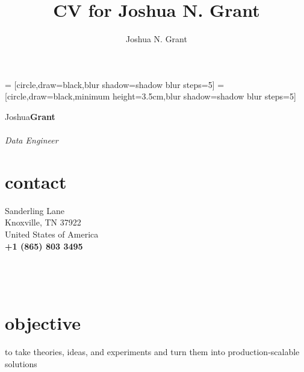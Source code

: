 \documentclass[10pt]{article}%
\author{Joshua N. Grant}
\title{CV for Joshua N. Grant}
\begin{document}
%
%
 = [circle,draw=black,blur shadow={shadow blur steps=5}]%
 = [circle,draw=black,minimum height=3.5cm,blur shadow={shadow blur steps=5}]%
\begin{minipage}[ht]{.25\linewidth}%
  \setlength{\headsep}{-10pt}
  \setlength{\voffset}{-0.75in}
   {\Large Joshua\huge\textbf{Grant}} \\ \\
   {\large \textit{Data Engineer}}
   \section*{\faUser{} contact}%
      Sanderling Lane \\
     Knoxville, TN 37922 \\
     United States of America  \\
     \textbf{+1 (865) 803 3495} \faMobile \\
     \href{mailto:jngrant@live.com}{\color{linkcolor}{jngrant@live.com \faEnvelope}} \\
     \href{http://notjustadatum.blogspot.com}{\color{linkcolor}{notjustadatum.blogspot.com \faBold}} \\
     \href{http://github.com/sempervent}{\color{linkcolor}{github.com/sempervent \faGithubAlt}} \\
     \href{https://www.linkedin.com/in/joshua-grant-a3842968/}{\color{linkcolor}{\small linkedin.com/in/joshuanagrant} \faLinkedin}
     \flushleft%
   \section*{\faBullseye{} objective}%
   \flushright
   to take theories, ideas, and experiments and turn them into production-scalable solutions
   \flushleft

\end{minipage}
\end{document}
